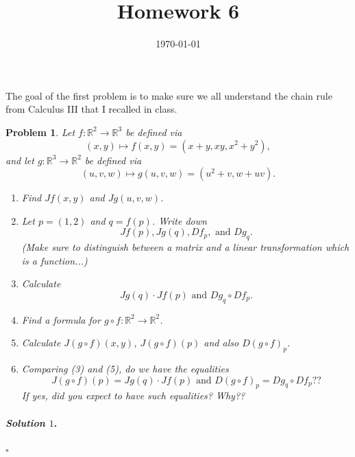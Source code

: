 \documentclass[reqno]{amsart}
\theoremstyle{plain}
\newtheorem{problem}{Problem}
\theoremstyle{definition}
\newenvironment{solution1}{\paragraph{\emph{Solution $1$}.}}{\hfill$\square$}
\begin{document}
 

\title[Homework 6]{Homework 6}

\date{\today} 
\maketitle 

The goal of the first problem is to make sure we all understand the chain rule from Calculus III that I recalled in class.
\begin{problem}
Let $f:\mathbb{R}^{2} \rightarrow \mathbb{R}^{3}$ be defined via
$$(x,y) \mapsto f(x,y) = (x+y,xy,x^{2}+y^{2}), $$
and let $g:\mathbb{R}^{3} \rightarrow \mathbb{R}^{2}$ be defined via
$$(u,v,w) \mapsto g(u,v,w) = (u^{2} + v, w + uv). $$
\begin{enumerate}
\item Find $Jf(x,y)$ and $Jg(u,v,w)$.
\item Let $p=(1,2)$ and $q = f(p)$.  Write down
$$Jf(p), Jg(q), Df_{p}, \text{ and } Dg_{q}. $$
(Make sure to distinguish between a matrix and a linear transformation which is a function...)
\item Calculate
$$Jg(q) \cdot Jf(p) \text{ and } Dg_{q} \circ Df_{p}.$$
\item Find a formula for $g \circ f:\mathbb{R}^{2} \rightarrow \mathbb{R}^{2}$.
\item Calculate $J (g\circ f) (x,y)$, $J (g \circ f) (p)$ and also $D(g\circ f)_{p}$.
\item Comparing (3) and (5), do we have the equalities
$$J(g \circ f)(p) = Jg(q) \cdot Jf(p) \text{ and } D(g \circ f)_{p} = Dg_{q} \circ Df_{p}??$$
If yes, did you expect to have such equalities?  Why??
\end{enumerate}
\end{problem}
\begin{solution1}

\end{solution1}
\end{document}
